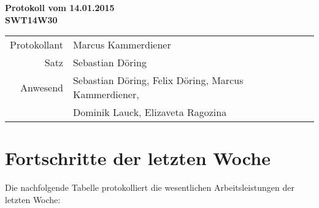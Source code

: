 \documentclass{scrartcl}
\begin{document}
\begin{center}
\LARGE \bf{Protokoll vom 14.01.2015 \\
SWT14W30}
\end{center}

\begin{tabular}{rp{10cm}}
Protokollant & Marcus Kammerdiener \\
Satz & Sebastian Döring \\
Anwesend & Sebastian Döring, Felix Döring, Marcus Kammerdiener,\\
& Dominik Lauck, Elizaveta Ragozina \\
\end{tabular}

\vspace*{3em}

\section{Fortschritte der letzten Woche}
Die nachfolgende Tabelle protokolliert die wesentlichen Arbeitsleistungen der letzten Woche:\\[.4cm]
\renewcommand{\arraystretch}{2}
\end{document}

